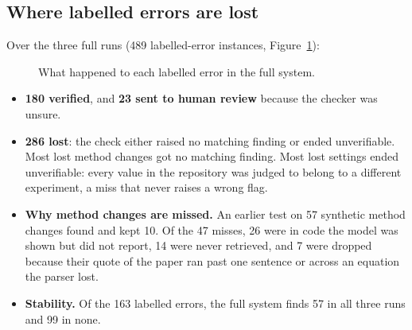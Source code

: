 \documentclass[11pt,a4paper]{article}
\begin{document}
\subsection{Where labelled errors are lost}
Over the three full runs (489 labelled-error instances, Figure~\ref{fig:fate}):
\begin{figure}[h]
\centering\footnotesize
{}
\caption{What happened to each labelled error in the full system.}
\label{fig:fate}
\end{figure}
\begin{itemize}
\item \textbf{180 verified}, and \textbf{23 sent to human review} because the checker was unsure.
\item \textbf{286 lost}: the check either raised no matching finding or ended unverifiable.
Most lost method changes got no matching finding. Most lost settings ended unverifiable: every
value in the repository was judged to belong to a different experiment, a miss that never raises a
wrong flag.
\item \textbf{Why method changes are missed.} An earlier test on 57 synthetic method changes found
and kept 10. Of the 47 misses, 26 were in code the model was shown but did not report, 14 were
never retrieved, and 7 were dropped because their quote of the paper ran past one sentence or
across an equation the parser lost.
\item \textbf{Stability.} Of the 163 labelled errors, the full system finds 57 in all three runs and
99 in none.
\end{itemize}
\end{document}
